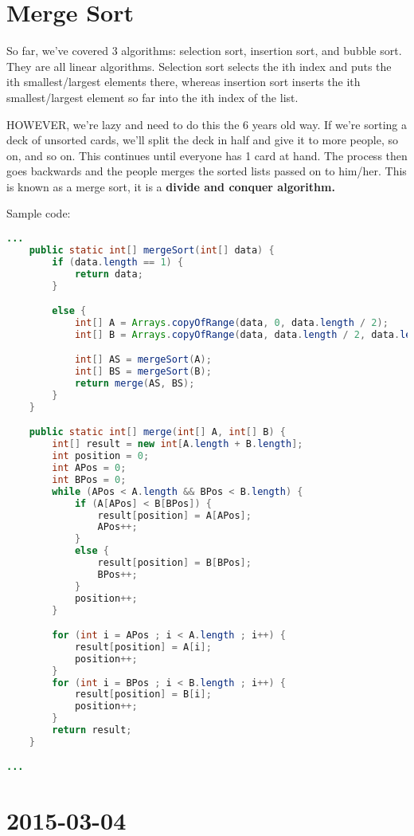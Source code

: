 \documentclass [12 pt, twoside] {article}
\begin{document}
\section{Merge Sort}

So far, we've covered 3 algorithms: selection sort, insertion sort, and bubble sort.
They are all linear algorithms. Selection sort selects the ith index and puts the ith
smallest/largest elements there, whereas insertion sort inserts the ith smallest/largest
element so far into the ith index of the list.

HOWEVER, we're lazy and need to do this the 6 years old way. If we're sorting a deck of
unsorted cards, we'll split the deck in half and give it to more people, so on, and so
on. This continues until everyone has 1 card at hand. The process then goes backwards
and the people merges the sorted lists passed on to him/her. This is known as a merge sort,
it is a \textbf{divide and conquer algorithm.}

Sample code:
\begin{lstlisting}[language=java]
...
	public static int[] mergeSort(int[] data) {
        if (data.length == 1) {
            return data;
        }

        else {
            int[] A = Arrays.copyOfRange(data, 0, data.length / 2);
            int[] B = Arrays.copyOfRange(data, data.length / 2, data.length);

            int[] AS = mergeSort(A);
            int[] BS = mergeSort(B);
            return merge(AS, BS);
        }
    }

    public static int[] merge(int[] A, int[] B) {
        int[] result = new int[A.length + B.length];
        int position = 0;
        int APos = 0;
        int BPos = 0;
        while (APos < A.length && BPos < B.length) {
            if (A[APos] < B[BPos]) {
                result[position] = A[APos];
                APos++;
            }
            else {
                result[position] = B[BPos];
                BPos++;
            }
            position++;
        }

        for (int i = APos ; i < A.length ; i++) {
            result[position] = A[i];
            position++;
        }
        for (int i = BPos ; i < B.length ; i++) {
            result[position] = B[i];
            position++;
        }
        return result;
    }

...
\end{lstlisting}

\section{2015-03-04}
\end{document}

